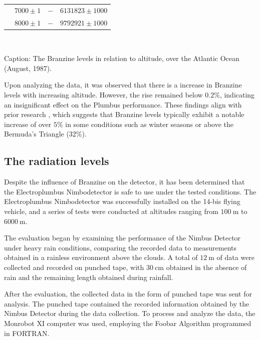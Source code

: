 \documentclass[portuguese]{cenarticle}
\begin{document}
\begin{table}[!h]
\begin{center}
\begin{tabular}{@{}lccc@{}}
                                         & $7000\pm 1$       & $-$                &    $6131823 \pm 1000$              \\ 
                                         & $8000\pm 1$       & $-$                &    $9792921 \pm 1000$              \\ \bottomrule
  \end{tabular}\\[3mm]
\end{center}
Caption: The Branzine levels in relation to altitude, over the Atlantic Ocean (August, 1987).\\
\end{table}
\vspace{-6mm}
Upon analyzing the data, it was observed that there is a increase in Branzine levels with increasing altitude. However, the rise remained below $0.2\%$, indicating an insignificant effect on the Plumbus performance. These findings align with prior research \citep{Gagaia1923}, which suggests that Branzine levels typically exhibit a notable increase of over $5\%$ in some conditions such as winter seasons or above the Bermuda's Triangle ($32\%$).

\subsection{The radiation levels}

Despite the influence of Branzine on the detector, it has been determined that the Electroplumbus Nimbodetector is safe to use under the tested conditions. The Electroplumbus Nimbodetector was successfully installed on the 14-bis flying vehicle, and a series of tests were conducted at altitudes ranging from $\SI{100}{\meter}$ to $\SI{6000}{\meter}$.

The evaluation began by examining the performance of the Nimbus Detector under heavy rain conditions, comparing the recorded data to measurements obtained in a rainless environment above the clouds. A total of $\SI{12}{\meter}$ of data were collected and recorded on punched tape, with $\SI{30}{\centi\meter}$ obtained in the absence of rain and the remaining length obtained during rainfall.

After the evaluation, the collected data in the form of punched tape was sent for analysis. The punched tape contained the recorded information obtained by the Nimbus Detector during the data collection. To process and analyze the data, the Monrobot XI computer was used, employing the Foobar Algorithm programmed in FORTRAN.
\end{document}
